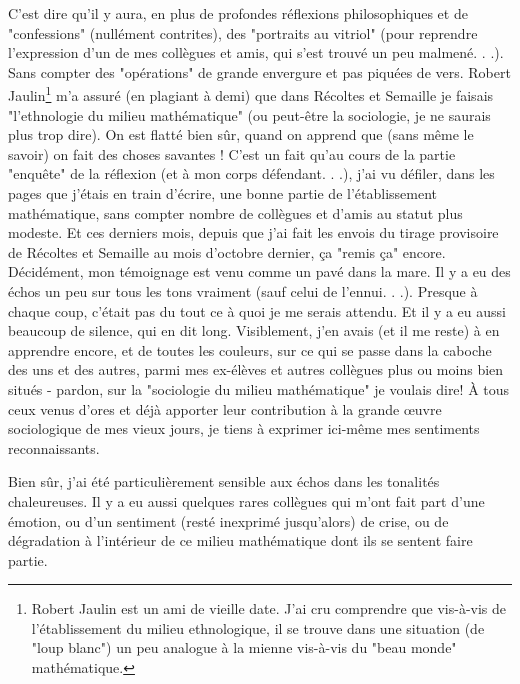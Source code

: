 C’est dire qu’il y aura, en plus de profondes réflexions philosophiques et de "confessions" (nullément contrites), des "portraits au vitriol" (pour reprendre l’expression d’un de mes collègues et amis, qui s’est trouvé un peu malmené. . .). Sans compter des "opérations" de grande envergure et pas piquées de vers. Robert Jaulin\footnote{Robert Jaulin est un ami de vieille date. J’ai cru comprendre que vis-à-vis de l’établissement du milieu ethnologique, il se trouve dans une situation (de "loup blanc") un peu analogue à la mienne vis-à-vis du "beau monde" mathématique.} m’a assuré (en plagiant à demi) que dans Récoltes et Semaille je faisais "l’ethnologie du milieu mathématique" (ou peut-être la sociologie, je ne saurais plus trop dire). On est flatté bien sûr, quand on apprend que (sans même le savoir) on fait des choses savantes ! C’est un fait qu’au cours de la partie "enquête" de la réflexion (et à mon corps défendant. . .), j’ai vu défiler, dans les pages que j’étais en train d’écrire, une bonne partie de l’établissement mathématique, sans compter nombre de collègues et d’amis au statut plus modeste. Et ces derniers mois, depuis que j’ai fait les envois du tirage provisoire de Récoltes et Semaille au mois d’octobre dernier, ça "remis ça" encore. Décidément, mon témoignage est venu comme un pavé dans la mare. Il y a eu des échos un peu sur tous les tons vraiment (sauf celui de l’ennui. . .). Presque à chaque coup, c’était pas du tout ce à quoi je me serais attendu. Et il y a eu aussi beaucoup de silence, qui en dit long. Visiblement, j’en avais (et il me reste) à en apprendre encore, et de toutes les couleurs, sur ce qui se passe dans la caboche des uns et des autres, parmi mes ex-élèves et autres collègues plus ou moins bien situés - pardon, sur la "sociologie du milieu mathématique" je voulais dire! À tous ceux venus d’ores et déjà apporter leur contribution à la grande œuvre sociologique de mes vieux jours, je tiens à exprimer ici-même mes sentiments reconnaissants.

Bien sûr, j’ai été particulièrement sensible aux échos dans les tonalités chaleureuses. Il y a eu aussi quelques rares collègues qui m’ont fait part d’une émotion, ou d’un sentiment (resté inexprimé jusqu’alors) de crise, ou de dégradation à l’intérieur de ce milieu mathématique dont ils se sentent faire partie.

